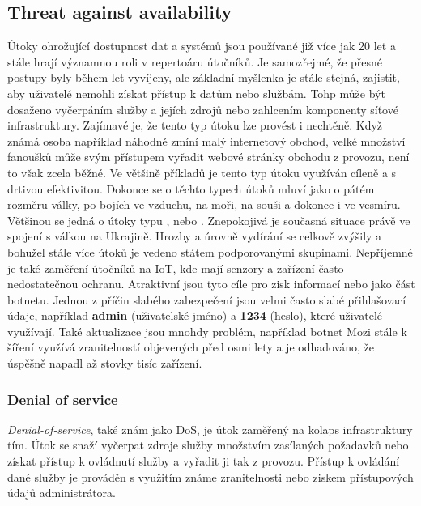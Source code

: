 \subsection{Threat against availability}\label{subsec:threat-against-availability}
Útoky ohrožující dostupnost dat a systémů jsou používané již více jak 20 let a stále hrají významnou roli v repertoáru útočníků.
Je samozřejmé, že přesné postupy byly během let vyvíjeny, ale základní myšlenka je stále stejná, zajistit, aby uživatelé nemohli získat přístup k datům nebo službám.
Tohp může být dosaženo vyčerpáním služby a jejích zdrojů nebo zahlcením komponenty síťové infrastruktury.
Zajímavé je, že tento typ útoku lze provést i nechtěně.
Když známá osoba například náhodně zmíní malý internetový obchod, velké množství fanoušků může svým přístupem vyřadit webové stránky obchodu z provozu, není to však zcela běžné.
Ve většině příkladů je tento typ útoku využíván cíleně a s drtivou efektivitou.
Dokonce se o těchto typech útoků mluví jako o pátém rozměru války, po bojích ve vzduchu, na moři, na souši a dokonce i ve vesmíru.
Většinou se jedná o útoky typu ,  nebo .
Znepokojivá je současná situace právě ve spojení s válkou na Ukrajině.
Hrozby a úrovně vydírání se celkově zvýšily a bohužel stále více útoků je vedeno státem podporovanými skupinami.
Nepříjemné je také zaměření útočníků na \ac{IoT}, kde mají senzory a zařízení často nedostatečnou ochranu.
Atraktivní jsou tyto cíle pro zisk informací nebo jako část botnetu.
Jednou z příčin slabého zabezpečení jsou velmi často slabé přihlašovací údaje, například \textbf{admin} (uživatelské jméno) a \textbf{1234} (heslo), které uživatelé využívají.
Také aktualizace jsou mnohdy problém, například botnet Mozi stále k šíření využívá zranitelností objevených před osmi lety a je odhadováno, že úspěšně napadl až stovky tisíc zařízení.\cite{Enisa_thread_landscape}


\subsubsection{Denial of service}
\textit{Denial-of-service}, také znám jako \ac{DoS}, je útok zaměřený na kolaps infrastruktury tím.
Útok se snaží vyčerpat zdroje služby množstvím zasílaných požadavků nebo získat přístup k ovládnutí služby a vyřadit ji tak z provozu.
Přístup k ovládání dané služby je prováděn s využitím známe zranitelnosti nebo ziskem přístupových údajů administrátora.\cite{cisco_most_common_attack}

